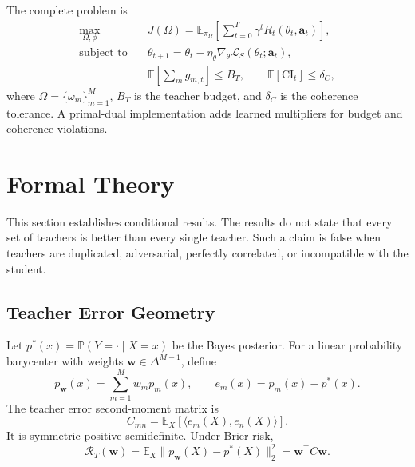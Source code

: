 \documentclass[10pt,twocolumn,a4paper]{article}
\newcommand{\E}{\mathbb{E}}
\newcommand{\Pp}{\mathbb{P}}
\newcommand{\cR}{\mathcal{R}}
\newcommand{\cL}{\mathcal{L}}
\newcommand{\simplex}{\Delta}
\begin{document}
The complete problem is
\begin{align}
 \max_{\Omega,\phi}\quad &
 J(\Omega)=\E_{\pi_\Omega}\left[\sum_{t=0}^{T}\gamma^tR_t(\theta_t,\bm a_t)\right],
\label{eq:outer}\\
 \text{subject to}\quad &
 \theta_{t+1}=\theta_t-\eta_\theta\nabla_\theta\cL_S(\theta_t;\bm a_t),
\label{eq:inner}\\
 &\E\left[\sum_m g_{m,t}\right]\le B_T,
 \qquad \E[\mathrm{CI}_t]\le \delta_C,
\label{eq:constraints}
\end{align}
where \(\Omega=\{\omega_m\}_{m=1}^{M}\), \(B_T\) is the teacher budget, and \(\delta_C\) is the coherence tolerance. A primal-dual implementation adds learned multipliers for budget and coherence violations.

\section{Formal Theory}
\label{sec:theory}

This section establishes conditional results. The results do not state that every set of teachers is better than every single teacher. Such a claim is false when teachers are duplicated, adversarial, perfectly correlated, or incompatible with the student.

\subsection{Teacher Error Geometry}

Let \(p^*(x)=\Pp(Y=\cdot\mid X=x)\) be the Bayes posterior. For a linear probability barycenter with weights \(\bm w\in\simplex^{M-1}\), define
\begin{equation}
 p_{\bm w}(x)=\sum_{m=1}^{M}w_mp_m(x),
 \qquad e_m(x)=p_m(x)-p^*(x).
\label{eq:errors}
\end{equation}
The teacher error second-moment matrix is
\begin{equation}
 C_{mn}=\E_X\left[\langle e_m(X),e_n(X)\rangle\right].
\label{eq:covmatrix}
\end{equation}
It is symmetric positive semidefinite. Under Brier risk,
\begin{equation}
 \cR_T(\bm w)
 =\E_X\|p_{\bm w}(X)-p^*(X)\|_2^2
 =\bm w^\top C\bm w.
\label{eq:quadraticrisk}
\end{equation}
\end{document}
